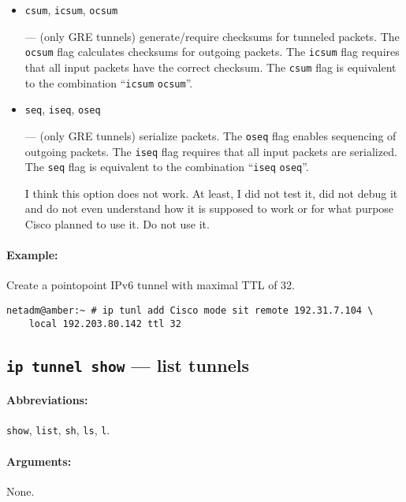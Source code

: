 \begin{itemize}
\item \verb|csum|, \verb|icsum|, \verb|ocsum|

--- (only GRE tunnels) generate/require checksums for tunneled packets.
   The \verb|ocsum| flag calculates checksums for outgoing packets.
   The \verb|icsum| flag requires that all input packets have the correct
   checksum. The \verb|csum| flag is equivalent to the combination
  ``\verb|icsum| \verb|ocsum|''.

\item \verb|seq|, \verb|iseq|, \verb|oseq|

--- (only GRE tunnels) serialize packets.
   The \verb|oseq| flag enables sequencing of outgoing packets.
   The \verb|iseq| flag requires that all input packets are serialized.
   The \verb|seq| flag is equivalent to the combination ``\verb|iseq| \verb|oseq|''.

\begin{NB}
 I think this option does not
	work. At least, I did not test it, did not debug it and
	do not even understand how it is supposed to work or for what
	purpose Cisco planned to use it. Do not use it.
\end{NB}


\end{itemize}

\paragraph{Example:} Create a pointopoint IPv6 tunnel with maximal TTL of 32.
\begin{verbatim}
netadm@amber:~ # ip tunl add Cisco mode sit remote 192.31.7.104 \
    local 192.203.80.142 ttl 32 
\end{verbatim}

\subsection{{\tt ip tunnel show} --- list tunnels}

\paragraph{Abbreviations:} \verb|show|, \verb|list|, \verb|sh|, \verb|ls|, \verb|l|.


\paragraph{Arguments:} None.

